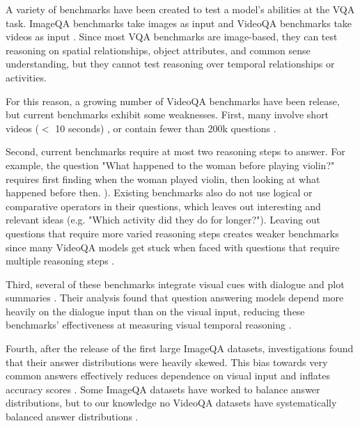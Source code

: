\documentclass[10pt,twocolumn,letterpaper]{article}
\newcommand{\mgm}[1]{{\color{cyan}{mgm: #1}}}
\begin{document}
A variety of benchmarks have been created to test a model's abilities at the VQA task. ImageQA benchmarks take images as input \cite{johnson2017clevr, hudson2019gqa, antol2015vqa, zellers2019recognition, goyal2017making, krishna2017visual, zhu2016visual7w, kim2020answering} and VideoQA benchmarks take videos as input \cite{tapaswi2016movieqa, lei2018tvqa, jang2017tgif, kim2017deepstory, xu2017video, maharaj2017dataset, zeng2016leveraging, yu2019activitynet}. Since most VQA benchmarks are image-based, they can test reasoning on spatial relationships, object attributes, and common sense understanding, but they cannot test reasoning over temporal relationships or activities. 

For this reason, a growing number of VideoQA benchmarks have been release, but current benchmarks exhibit some weaknesses. First, many involve short videos ($<$ 10 seconds) \cite{jang2017tgif, kim2017deepstory, xu2017video, maharaj2017dataset}, or contain fewer than 200k questions \mgm{what counts as small?} \cite{tapaswi2016movieqa, lei2018tvqa, kim2017deepstory, xu2017video, jang2017tgif, yu2019activitynet, zeng2016leveraging}. 

Second, current benchmarks require at most two reasoning steps to answer. For example, the question "What happened to the woman before playing violin?" requires first finding when the woman played violin, then looking at what happened before then. \cite{yu2019activitynet}). Existing benchmarks also do not use logical or comparative operators in their questions, which leaves out interesting and relevant ideas (e.g. "Which activity did they do for longer?"). Leaving out questions that require more varied reasoning steps creates weaker benchmarks since many VideoQA models get stuck when faced with questions that require multiple reasoning steps \cite{fan2019heterogeneous}. 

Third, several of these benchmarks integrate visual cues with dialogue and plot summaries \cite{lei2018tvqa, tapaswi2016movieqa, kim2017deepstory}. Their analysis found that question answering models depend more heavily on the dialogue input than on the visual input, reducing these benchmarks' effectiveness at measuring visual temporal reasoning \cite{tapaswi2016movieqa, lei2018tvqa}. 

Fourth, after the release of the first large ImageQA datasets, investigations found that their answer distributions were heavily skewed. This bias towards very common answers effectively reduces dependence on visual input and inflates accuracy scores \cite{goyal2017making, hudson2019gqa}. Some ImageQA datasets have worked to balance answer distributions, but to our knowledge no VideoQA datasets have systematically balanced answer distributions \cite{goyal2017making, hudson2019gqa}. 
\end{document}
